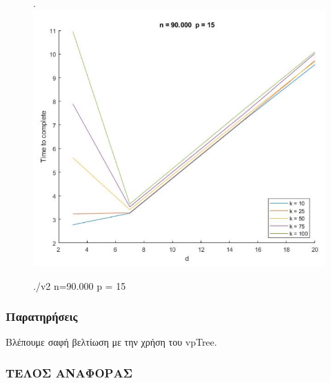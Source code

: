 \documentclass[10pt]{report}
\begin{document}
\begin{figure}[H]
\centering
\left.
\includegraphics[scale=0.4]{../plots/v2_diagram_Random_array_2.png}
\caption{./v2 n=90.000 p = 15}
\end{figure} 

\subsubsection{Παρατηρήσεις}
Βλέπουμε σαφή βελτίωση με την χρήση του vpTree.

\subsubsection{ΤΕΛΟΣ ΑΝΑΦΟΡΑΣ}
\end{document}
